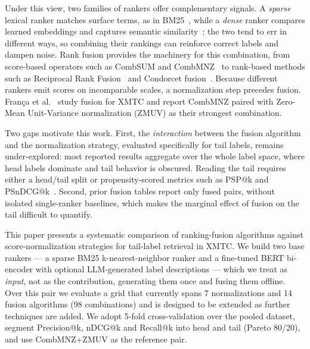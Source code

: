 \documentclass[sigconf,nonacm]{acmart}
\begin{document}
Under this view, two families of rankers offer complementary signals. A \emph{sparse}
lexical ranker matches surface terms, as in BM25~\cite{robertson2009probabilistic},
while a \emph{dense} ranker compares learned embeddings and captures semantic
similarity~\cite{Karpukhin2020DPR}; the two tend to err in different ways, so combining
their rankings can reinforce correct labels and dampen noise. Rank fusion provides the
machinery for this combination, from score-based operators such as CombSUM and
CombMNZ~\cite{Fox1994CombMNZ} to rank-based methods such as Reciprocal Rank
Fusion~\cite{Cormack2009RRF} and Condorcet fusion~\cite{Montague2002Condorcet}. Because
different rankers emit scores on incomparable scales, a normalization step precedes
fusion. França et al.~\cite{Franca2025RankFusionXMTC} study fusion for XMTC and report
CombMNZ paired with Zero-Mean Unit-Variance normalization (ZMUV) as their strongest
combination.

Two gaps motivate this work. First, the \emph{interaction} between the fusion
algorithm and the normalization strategy, evaluated specifically for tail labels,
remains under-explored: most reported results aggregate over the whole label space,
where head labels dominate and tail behavior is obscured. Reading the tail requires
either a head/tail split or propensity-scored metrics such as PSP@k and
PSnDCG@k~\cite{Jain2016PropensityXML}. Second, prior fusion tables report only fused
pairs, without isolated single-ranker baselines, which makes the marginal effect of
fusion on the tail difficult to quantify.

This paper presents a systematic comparison of ranking-fusion algorithms against
score-normalization strategies for tail-label retrieval in XMTC. We build two base
rankers --- a sparse BM25 k-nearest-neighbor ranker and a fine-tuned BERT bi-encoder
with optional LLM-generated label descriptions --- which we treat as \emph{input},
not as the contribution, generating them once and fusing them offline. Over this pair
we evaluate a grid that currently spans 7 normalizations and 14 fusion algorithms
(98 combinations) and is designed to be extended as further techniques are added. We
adopt 5-fold cross-validation over the pooled dataset, segment Precision@k, nDCG@k and
Recall@k into head and tail (Pareto 80/20), and use CombMNZ+ZMUV as the reference pair.
\end{document}

